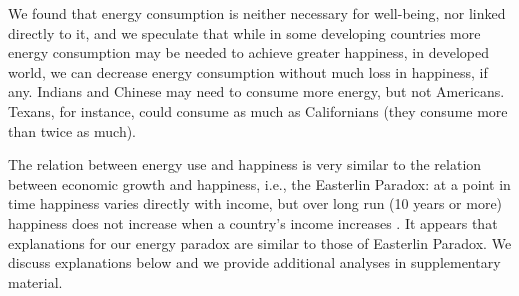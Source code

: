 \documentclass[10pt, letterpaper]{article}
\begin{document}
\begin{spacing}{1.5}
We found that energy consumption is neither necessary for well-being, nor linked
directly to it, and we speculate that while in some developing countries more
energy consumption may be needed to achieve greater happiness, in developed world, we
 can decrease energy consumption without much loss in happiness, if any. %
Indians and Chinese may need to consume more energy, but not Americans. 
Texans, for instance,  could consume as much as Californians (they consume more than twice as much). %

The relation between energy use and happiness is very similar to the relation
between economic growth and happiness, i.e., the Easterlin Paradox: at a point
in time happiness varies directly with income, but over long run (10 years or
more) happiness does not increase when a country's income increases
\citep{easterlin10B}. It appears that explanations for our energy paradox are
similar to those of Easterlin Paradox. We discuss explanations below and we
provide additional analyses in supplementary material.


\end{spacing}
\end{document}
